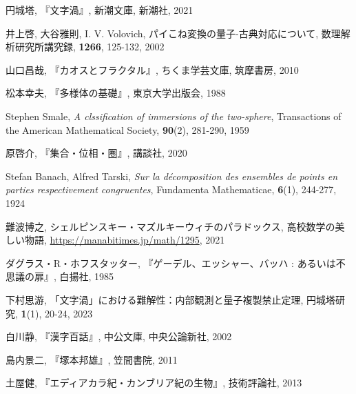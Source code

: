 \documentclass[10pt, a5paper, twoside]{jsarticle}
\theoremstyle{definition}
\begin{document}
	\begin{thebibliography}{99}

		 円城塔, 『文字渦』, 新潮文庫, 新潮社, 2021

		 井上啓, 大谷雅則, I. V. Volovich, パイこね変換の量子-古典対応について, 数理解析研究所講究録, \textbf{1266}, 125-132, 2002

		 山口昌哉, 『カオスとフラクタル』, ちくま学芸文庫, 筑摩書房, 2010

		 松本幸夫, 『多様体の基礎』, 東京大学出版会, 1988

		 Stephen Smale, \textit{A clssification of immersions of the two-sphere}, Transactions of the American Mathematical Society, \textbf{90}(2), 281-290, 1959

		 原啓介, 『集合・位相・圏』, 講談社, 2020

		 Stefan Banach, Alfred Tarski, \textit{Sur la décomposition des ensembles de points en parties respectivement congruentes}, Fundamenta Mathematicae, \textbf{6}(1), 244-277, 1924

		 難波博之, シェルピンスキー・マズルキーウィチのパラドックス, 高校数学の美しい物語, \url{https://manabitimes.jp/math/1295}, 2021

		 ダグラス・R・ホフスタッター, 『ゲーデル、エッシャー、バッハ : あるいは不思議の扉』, 白揚社, 1985

		 下村思游, 「文字渦」における難解性：内部観測と量子複製禁止定理, 円城塔研究, \textbf{1}(1), 20-24, 2023


		 白川静, 『漢字百話』, 中公文庫, 中央公論新社, 2002

		 島内景二, 『塚本邦雄』, 笠間書院, 2011

		 土屋健, 『エディアカラ紀・カンブリア紀の生物』, 技術評論社, 2013

	\end{thebibliography}
\end{document}
